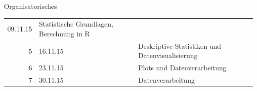 \documentclass[ignorenonframetext,]{beamer}
\begin{document}
\begin{frame}{Organisatorisches}
\begin{longtable}[c]{@{}rll@{}}
\begin{minipage}[t]{0.18\columnwidth}
09.11.15
\strut\end{minipage} &
\begin{minipage}[t]{0.46\columnwidth}\raggedright\strut
Statistische Grundlagen, Berechnung in R
\strut\end{minipage}\tabularnewline
\begin{minipage}[t]{0.18\columnwidth}\raggedleft\strut
5
\strut\end{minipage} &
\begin{minipage}[t]{0.18\columnwidth}\raggedright\strut
16.11.15
\strut\end{minipage} &
\begin{minipage}[t]{0.46\columnwidth}\raggedright\strut
Deskriptive Statistiken und Datenvisualisierung
\strut\end{minipage}\tabularnewline
\begin{minipage}[t]{0.18\columnwidth}\raggedleft\strut
6
\strut\end{minipage} &
\begin{minipage}[t]{0.18\columnwidth}\raggedright\strut
23.11.15
\strut\end{minipage} &
\begin{minipage}[t]{0.46\columnwidth}\raggedright\strut
Plots und Datenverarbeitung
\strut\end{minipage}\tabularnewline
\begin{minipage}[t]{0.18\columnwidth}\raggedleft\strut
7
\strut\end{minipage} &
\begin{minipage}[t]{0.18\columnwidth}\raggedright\strut
30.11.15
\strut\end{minipage} &
\begin{minipage}[t]{0.46\columnwidth}\raggedright\strut
Datenverarbeitung
\strut\end{minipage}\tabularnewline
\bottomrule
\end{longtable}

\end{frame}
\end{document}

